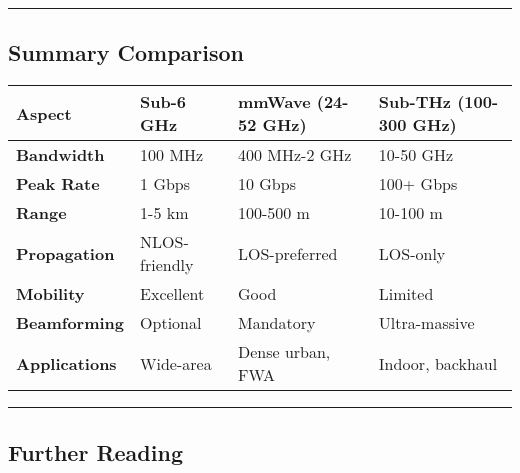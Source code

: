 
\begin{center}\rule{0.5\linewidth}{0.5pt}\end{center}

\subsection{\texorpdfstring{ Summary
Comparison}{ Summary Comparison}}\label{summary-comparison}

{\def\LTcaptype{} %
\begin{longtable}[]{@{}llll@{}}
\toprule\noalign{}
Aspect & Sub-6 GHz & mmWave (24-52 GHz) & Sub-THz (100-300 GHz) \\
\midrule\noalign{}
\endhead
\bottomrule\noalign{}
\endlastfoot
\textbf{Bandwidth} & 100 MHz & 400 MHz-2 GHz & 10-50 GHz \\
\textbf{Peak Rate} & 1 Gbps & 10 Gbps & 100+ Gbps \\
\textbf{Range} & 1-5 km & 100-500 m & 10-100 m \\
\textbf{Propagation} & NLOS-friendly & LOS-preferred & LOS-only \\
\textbf{Mobility} & Excellent & Good & Limited \\
\textbf{Beamforming} & Optional & Mandatory & Ultra-massive \\
\textbf{Applications} & Wide-area & Dense urban, FWA & Indoor, backhaul \\
\end{longtable}
}

\begin{center}\rule{0.5\linewidth}{0.5pt}\end{center}

\subsection{\texorpdfstring{ Further
Reading}{ Further Reading}}\label{further-reading}

